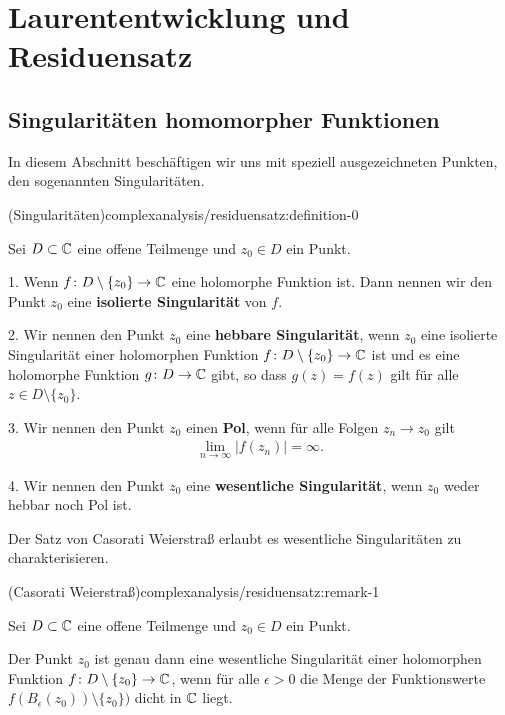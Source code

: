 \section{Laurententwicklung und Residuensatz}
\label{\detokenize{complexanalysis/residuensatz:laurententwicklung-und-residuensatz}}\label{\detokenize{complexanalysis/residuensatz::doc}}

\subsection{Singularitäten homomorpher Funktionen}
\label{\detokenize{complexanalysis/residuensatz:singularitaten-homomorpher-funktionen}}
\par
In diesem Abschnitt beschäftigen wir uns mit speziell ausgezeichneten Punkten, den sogenannten Singularitäten.
\begin{definition}{(Singularitäten)}{complexanalysis/residuensatz:definition-0}



\par
Sei \(D \subset \mathbb{C}\) eine offene Teilmenge und \(z_0 \in D\) ein Punkt.

\par
1. Wenn \(f \colon D \setminus \{z_0\} \rightarrow \mathbb{C}\) eine holomorphe Funktion ist.
Dann nennen wir den Punkt \(z_0\) eine \textbf{isolierte Singularität} von \(f\).

\par
2. Wir nennen den Punkt \(z_0\) eine \textbf{hebbare Singularität}, wenn \(z_0\) eine isolierte Singularität einer holomorphen Funktion \(f \colon D \setminus \{z_0\} \rightarrow \mathbb{C}\) ist und es eine holomorphe Funktion \(g \colon D \rightarrow \mathbb{C}\) gibt, so dass \(g(z) = f(z)\) gilt für alle \(z \in D \setminus \{z_0\}\).

\par
3. Wir nennen den Punkt \(z_0\) einen \textbf{Pol}, wenn für alle Folgen \(z_n \rightarrow z_0\) gilt
\begin{align*}
\lim_{n\rightarrow \infty} |f(z_n)| = \infty.
\end{align*}
\par
4. Wir nennen den Punkt \(z_0\) eine \textbf{wesentliche Singularität}, wenn \(z_0\) weder hebbar noch Pol ist.
\end{definition}

\par
Der Satz von Casorati Weierstraß erlaubt es wesentliche Singularitäten zu charakterisieren.
\begin{remark}{(Casorati Weierstraß)}{complexanalysis/residuensatz:remark-1}



\par
Sei \(D \subset \mathbb{C}\) eine offene Teilmenge und \(z_0 \in D\) ein Punkt.

\par
Der Punkt \(z_0\) ist genau dann eine wesentliche Singularität einer holomorphen Funktion \(f \colon D \setminus \{z_0\} \rightarrow \mathbb{C}\), wenn für alle \(\epsilon > 0\) die Menge der Funktionswerte \(f(B_\epsilon(z_0)) \setminus \{z_0\})\) dicht in \(\mathbb{C}\) liegt.
\end{remark}

